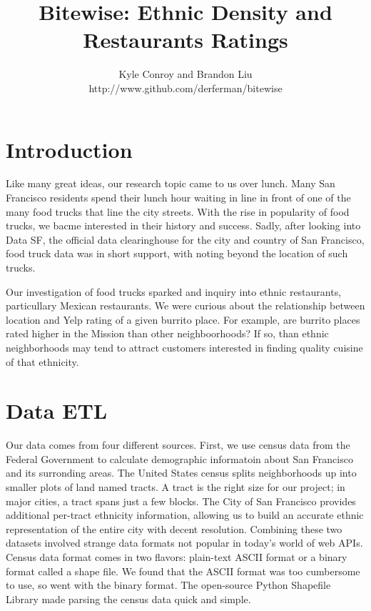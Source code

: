 \documentclass[11pt,twocolumn]{article}
\author{Kyle Conroy and Brandon Liu\\
http://www.github.com/derferman/bitewise}
\title{Bitewise: Ethnic Density and Restaurants Ratings}
\begin{document}
\maketitle

\section{Introduction}

Like many great ideas, our research topic came to us over lunch. Many San Francisco residents spend their lunch hour waiting in line in front of one of the many food trucks that line the city streets. With the rise in popularity of food trucks, we bacme interested in their history and success. Sadly, after looking into Data SF, the official data clearinghouse for the city and country of San Francisco, food truck data was in short support, with noting beyond the location of such trucks.

Our investigation of food trucks sparked and inquiry into ethnic restaurants, particullary Mexican restaurants. We were curious about the relationship between location and Yelp rating of a given burrito place. For example, are burrito places rated higher in the Mission than other neighboorhoods? If so, than ethnic neighborhoods may tend to attract customers interested in finding quality cuisine of that ethnicity.

\section{Data ETL}

Our data comes from four different sources. First, we use census data from the Federal Government to calculate demographic informatoin about San Francisco and its surronding areas. The United States census splits neighborhoods up into smaller plots of land named tracts. A tract is the right size for our project; in major cities, a tract spans just a few blocks. The City of San Francisco provides additional per-tract ethnicity information, allowing us to build an accurate ethnic representation of the entire city with decent resolution. Combining these two datasets involved strange data formats not popular in today's world of web APIs. Census data format comes in two flavors: plain-text ASCII format or a binary format called a shape file. We found that the ASCII format was too cumbersome to use, so went with the binary format. The open-source Python Shapefile Library made parsing the census data quick and simple.
\end{document}
